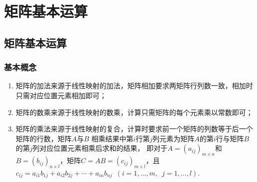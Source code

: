 \chapter{矩阵基本运算}

\section{矩阵基本运算}
\subsection{基本概念}
\begin{enumerate}
    \item 矩阵的加法来源于线性映射的加法，矩阵相加要求两矩阵行列数一致，相加时只需对应位置元素相加即可；
    \item 矩阵的数乘来源于线性映射的数乘，计算只需矩阵的每个元素乘以常数即可；
    \item 矩阵的乘法来源于线性映射的复合，计算时要求前一个矩阵的列数等于后一个矩阵的行数，矩阵$A$与$B$
    相乘结果中第$i$行第$j$列元素为矩阵$A$的第$i$行与矩阵$B$的第$j$列对应位置元素相乘后求和的结果，
    即对于$A=(a_{ij})_{m \times n}$和$B=(b_{ij})_{n \times l}$，矩阵$C=AB=(c_{ij})_{m \times l}$，且
    $c_{ij}=a_{i1}b_{1j}+a_{i2}b_{2j}+\cdots+a_{in}b_{nj}\enspace(i=1,\ldots,m,\enspace j=1,\ldots,l)$.
\end{enumerate}

